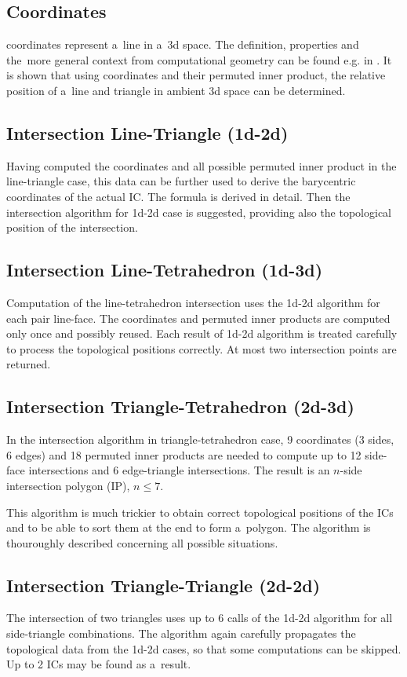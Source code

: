 \subsection{\plucker Coordinates}
\plucker coordinates represent a~line in a~3d space. The definition, properties and the~more general context from computational 
geometry can be found e.g. in \cite{joswig_plucker_2013}.
It is shown that using \plucker coordinates and their permuted inner product, the relative position of a~line and triangle
in ambient 3d space can be determined.


\subsection{Intersection Line-Triangle (1d-2d)}
\label{sec:1d-2d}
Having computed the \plucker coordinates and all possible permuted inner product in the line-triangle case,
this data can be further used to derive the barycentric coordinates of the actual IC.
The formula is derived in detail.
Then the intersection algorithm for 1d-2d case is suggested, providing also the topological position of the intersection.


\subsection{Intersection Line-Tetrahedron (1d-3d)}
Computation of the line-tetrahedron intersection uses the 1d-2d algorithm for each pair line-face.
The \plucker coordinates and permuted inner products are computed only once and possibly reused.
Each result of 1d-2d algorithm is treated carefully to process the topological positions correctly.
At most two intersection points are returned.


\subsection{Intersection Triangle-Tetrahedron (2d-3d)}
In the intersection algorithm in triangle-tetrahedron case, 9 \plucker coordinates (3 sides, 6 edges) and 18 permuted inner products
are needed to compute up to 12 side-face intersections and 6 edge-triangle intersections.
The result is an $n$-side intersection polygon (IP), $n\le 7$.

This algorithm is much trickier to obtain correct topological positions of the ICs and to be able to sort them at the end
to form a~polygon. The algorithm is thouroughly described concerning all possible situations.

\subsection{Intersection Triangle-Triangle (2d-2d)}
The intersection of two triangles uses up to 6 calls of the 1d-2d algorithm for all side-triangle combinations.
The algorithm again carefully propagates the topological data from the 1d-2d cases, so that some computations can be skipped.
Up to 2 ICs may be found as a~result.

